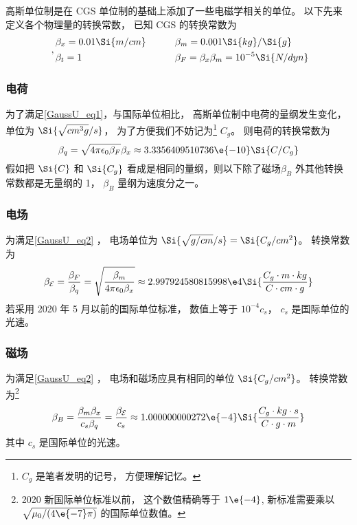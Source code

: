 

高斯单位制是在 CGS 单位制的基础上添加了一些电磁学相关的单位。 以下先来定义各个物理量的转换常数， 
已知 CGS 的转换常数为
\begin{equation}\label{GaussU_eq3}~,
\begin{aligned}
&\beta_x = 0.01\Si{m/cm} &\qquad &\beta_m = 0.001\Si{kg}/\Si{g}\\
&\beta_t = 1 &\qquad  &\beta_F = \beta_x \beta_m = 10^{-5}\Si{N/dyn}
\end{aligned}
\end{equation}

\subsubsection{电荷}
为了满足\autoref{GaussU_eq1}，与国际单位相比， 高斯单位制中电荷的量纲发生变化， 单位为 $\Si{\sqrt{cm^3 g}/s}$， 为了方便我们不妨记为\footnote{$C_g$ 是笔者发明的记号， 方便理解记忆。} $C_g$。 则电荷的转换常数为
\begin{equation}
\beta_q = \sqrt{4\pi\epsilon_0\beta_F} \beta_x \approx 3.3356409510736\e{-10} \Si{C/C_g}
\end{equation}
假如把 $\Si{C}$ 和 $\Si{C_g}$ 看成是相同的量纲，则以下除了磁场$\beta_B$ 外其他转换常数都是无量纲的 1， $\beta_B$ 量纲为速度分之一。

\subsubsection{电场}
为满足\autoref{GaussU_eq2} ， 电场单位为 $\Si{\sqrt{g/cm}/s} = \Si{C_g/cm^2}$。 转换常数为
\begin{equation}
\beta_{\mathcal E} = \frac{\beta_F}{\beta_q} = \sqrt{\frac{\beta_m}{4\pi\epsilon_0 \beta_x}} \approx 2.997924580815998\e4 \Si{\frac{C_g\cdot m\cdot kg}{C\cdot cm\cdot g}}
\end{equation}
若采用 2020 年 5 月以前的国际单位标准， 数值上等于 $10^{-4} c_{s}$， $c_{s}$ 是国际单位的光速。

\subsubsection{磁场}
为满足\autoref{GaussU_eq2} ， 电场和磁场应具有相同的单位 $\Si{C_g/cm^2}$。 转换常数为\footnote{2020 新国际单位标准以前， 这个数值精确等于 $1\e{-4}$, 新标准需要乘以 $\sqrt{\mu_0/(4\e{-7}\pi)}$ 的国际单位数值。}
\begin{equation}
\beta_B = \frac{\beta_m\beta_x}{c_s\beta_q} = \frac{\beta_{\mathcal E}}{c_s} \approx 1.000000000272\e{-4} \Si{\frac{C_g\cdot kg \cdot s}{C \cdot g \cdot m}}
\end{equation}
其中 $c_{s}$ 是国际单位的光速。

